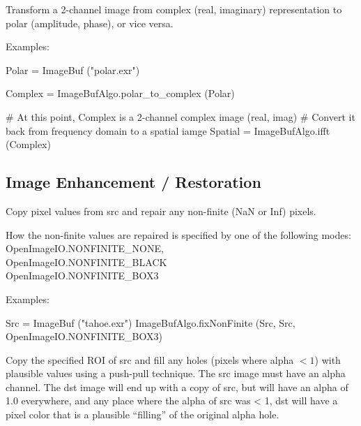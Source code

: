 Transform a 2-channel image from complex (real, imaginary) representation
to polar (amplitude, phase), or vice versa.

\smallskip
\noindent Examples:
\begin{code}
    Polar = ImageBuf ("polar.exr")

    Complex = ImageBufAlgo.polar_to_complex (Polar)

    # At this point, Complex is a 2-channel complex image (real, imag)
    # Convert it back from frequency domain to a spatial iamge
    Spatial = ImageBufAlgo.ifft (Complex)
\end{code}
\apiend



\subsection{Image Enhancement / Restoration}
\label{sec:iba:py:enhance}

 

Copy pixel values from {\cf src} and repair any non-finite ({\cf NaN} or {\cf
Inf}) pixels.

How the non-finite values are repaired is specified by one of the
following modes: \\
{\cf OpenImageIO.NONFINITE_NONE}, \\
{\cf OpenImageIO.NONFINITE_BLACK} \\ 
{\cf OpenImageIO.NONFINITE_BOX3}

\smallskip
\noindent Examples:
\begin{code}
    Src = ImageBuf ("tahoe.exr")
    ImageBufAlgo.fixNonFinite (Src, Src, OpenImageIO.NONFINITE_BOX3)
\end{code}
\apiend


 

Copy the specified ROI of {\cf src} and fill any 
holes (pixels where alpha $< 1$) with plausible values using a push-pull
technique.  The {\cf src} image must have
an alpha channel.  The {\cf dst} image will end up with a copy of src, but
will have an alpha of 1.0 everywhere, and any place where the alpha
of src was < 1, dst will have a pixel color that is a plausible
``filling'' of the original alpha hole.

